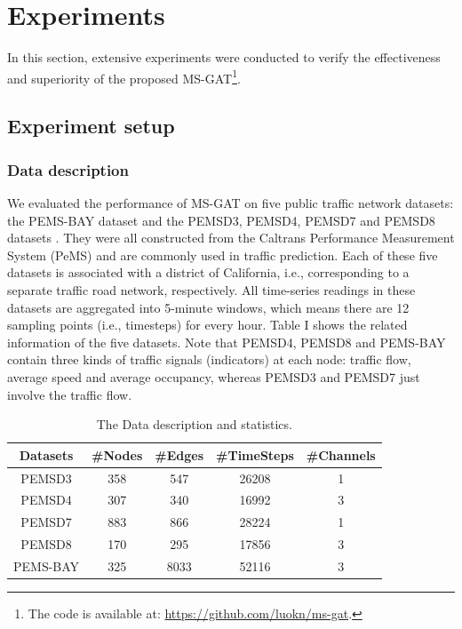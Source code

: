\section{Experiments}
\label{sec:experiments}
In this section, extensive experiments were conducted to verify the effectiveness and superiority of the proposed MS-GAT\footnote{The code is available at: \url{https://github.com/luokn/ms-gat}.}.

\subsection{Experiment setup}
\subsubsection{Data description}
We evaluated the performance of MS-GAT on five public traffic network datasets: the PEMS-BAY dataset  \cite{li2017diffusion} and the PEMSD3, PEMSD4, PEMSD7 and PEMSD8 datasets  \cite{song2020spatial}. They were all constructed from the Caltrans Performance Measurement System (PeMS) \cite{chen2001freeway} and are commonly used in traffic prediction. Each of these five datasets is associated with a district of California, i.e., corresponding to a separate traffic road network, respectively. All time-series readings in these datasets are aggregated into 5-minute windows, which means there are 12 sampling points (i.e., timesteps) for every hour. Table I shows the related information of the five datasets. Note that PEMSD4, PEMSD8 and PEMS-BAY contain three kinds of traffic signals (indicators) at each node: traffic flow, average speed and average occupancy, whereas PEMSD3 and PEMSD7 just involve the traffic flow.

\begin{table}[!htb]
    \caption{The Data description and statistics.}
    \label{tab:datasets}
    \centering
    \begin{tabular}{ccccc}
        \toprule[2pt]
        Datasets & \#Nodes & \#Edges & \#TimeSteps & \#Channels \\
        \hline
        PEMSD3   & 358     & 547     & 26208       & 1          \\
        PEMSD4   & 307     & 340     & 16992       & 3          \\
        PEMSD7   & 883     & 866     & 28224       & 1          \\
        PEMSD8   & 170     & 295     & 17856       & 3          \\
        PEMS-BAY & 325     & 8033    & 52116       & 3          \\
        \bottomrule[2pt]
    \end{tabular}
\end{table}

